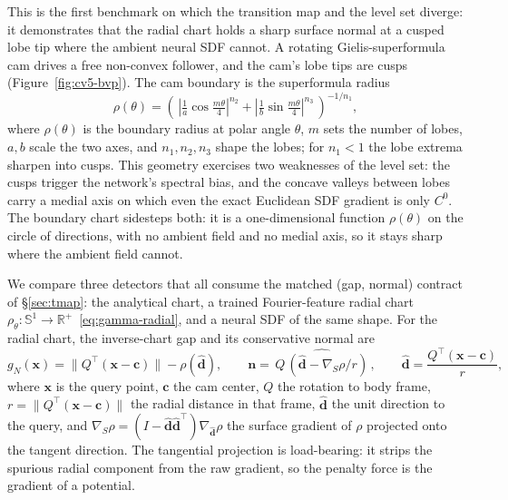 \documentclass{svjour3}                 %
\newcommand{\R}{\mathbb{R}}
\newcommand{\Sph}{\mathbb{S}}
\newcommand{\norm}[1]{\lVert#1\rVert}
\newcommand{\dhat}{\hat{\bm{d}}}
\newcommand{\nbf}{\bm{n}}
\newcommand{\xbf}{\bm{x}}
\newcommand{\gn}{g_{\scriptscriptstyle N}}
\newcommand{\grad}{\nabla}
\begin{document}
This is the first benchmark on which the transition map and the level set diverge: it demonstrates that the
radial chart holds a sharp surface normal at a cusped lobe tip where the ambient neural SDF cannot. A rotating
Gielis-superformula cam drives a free non-convex follower, and the cam's lobe tips are cusps
(Figure~\ref{fig:cv5-bvp}). The cam boundary is the superformula radius
\citep{gielis2003generic}
%
\begin{equation}\label{eq:superformula}
\rho(\theta) = \left(\,\left|\tfrac{1}{a}\cos\tfrac{m\theta}{4}\right|^{n_2}
+\left|\tfrac{1}{b}\sin\tfrac{m\theta}{4}\right|^{n_3}\,\right)^{-1/n_1},
\end{equation}
%
where $\rho(\theta)$ is the boundary radius at polar angle $\theta$, $m$ sets the number of lobes,
$a,b$ scale the two axes, and $n_1,n_2,n_3$ shape the lobes; for $n_1<1$ the lobe extrema sharpen into
cusps. This geometry exercises two weaknesses of the level set: the cusps trigger the
network's spectral bias, and the concave valleys between lobes carry a medial axis on which even the
exact Euclidean SDF gradient is only $C^0$. The boundary chart sidesteps both: it is a one-dimensional
function $\rho(\theta)$ on the circle of directions, with no ambient field and no medial axis, so it
stays sharp where the ambient field cannot.

We compare three detectors that all consume the matched (gap, normal) contract of \S\ref{sec:tmap}: the
analytical chart, a trained Fourier-feature radial chart $\rho_\theta:\Sph^1\to\R^{+}$~\eqref{eq:gamma-radial}, and a neural
SDF of the same shape. For the radial chart, the inverse-chart gap and its conservative normal are
%
\begin{equation}\label{eq:radial_gap_cv5}
\gn(\xbf) = \norm{Q^{\top}(\xbf-\bm{c})} - \rho(\dhat),\qquad
\nbf = \widehat{\,Q\,(\dhat - \grad_{\!S}\rho/r)\,},\qquad
\dhat = \frac{Q^{\top}(\xbf-\bm{c})}{r},
\end{equation}
%
where $\xbf$ is the query point, $\bm{c}$ the cam center, $Q$ the rotation to body frame, $r =
\norm{Q^{\top}(\xbf-\bm{c})}$ the radial distance in that frame, $\dhat$ the unit direction to the
query, and $\grad_{\!S}\rho=(I-\dhat\dhat^{\top})\grad_{\dhat}\rho$ the surface gradient of $\rho$
projected onto the tangent direction. The tangential projection is load-bearing: it strips the spurious
radial component from the raw gradient, so the penalty force is the gradient of a potential.
\end{document}
